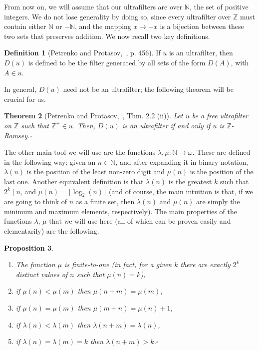 \documentclass{amsart}
\newtheorem{theorem}{Theorem}[section]
\newtheorem{proposition}[theorem]{Proposition}
\theoremstyle{definition}
\newtheorem{definition}[theorem]{Definition}
\theoremstyle{remark}
\numberwithin{equation}{section}
\begin{document}
From now on, we will assume that our ultrafilters are over $\mathbb N$, the set of positive integers. We do not lose generality by doing so, since every ultrafilter over $\mathbb Z$ must contain either $\mathbb N$ or $-\mathbb N$, and the mapping $x\longmapsto -x$ is a bijection between these two sets that preserves addition. We now recall two key definitions.

\begin{definition}[Petrenko and Protasov,~\cite{MR3681104}, p. 456]
    If $u$ is an ultrafilter, then $D(u)$ is defined to be the filter generated by all sets of the form $D(A)$, with $A\in u$.
\end{definition}

In general, $D(u)$ need not be an ultrafilter; the following theorem will be crucial for us.

\begin{theorem}[Petrenko and Protasov,~\cite{MR3681104}, Thm. 2.2 (ii)]
    Let $u$ be a free ultrafilter on $\mathbb Z$ such that $\mathbb Z^{+} \in u$. Then, $D(u)$ is an ultrafilter if and only if $u$ is $\mathbb Z$-Ramsey.\hfill $\square$
\end{theorem}

The other main tool we will use are the functions $\lambda,\mu:\mathbb N\longrightarrow\omega$. These are defined in the following way: given an $n\in\mathbb N$, and after expanding it in binary notation, $\lambda(n)$ is the position of the least non-zero digit and $\mu(n)$ is the position of the last one. Another equivalent definition is that $\lambda(n)$ is the greatest $k$ such that $2^k\mid  n$, and $\mu(n)=\lfloor\log_2(n)\rfloor$ (and of course, the main intuition is that, if we are going to think of $n$ as a finite set, then $\lambda(n)$ and $\mu(n)$ are simply the minimum and maximum elements, respectively). The main properties of the functions $\lambda$, $\mu$ that we will use here (all of which can be proven easily and elementarily) are the following.

\begin{proposition}\label{prop:propertieslambdamu}\hfill
    \begin{enumerate}
        \item The function $\mu$ is finite-to-one (in fact, for a given $k$ there are exactly $2^k$ distinct values of $n$ such that $\mu(n)=k$),
        \item if $\mu(n)<\mu(m)$ then $\mu(n+m)=\mu(m)$,
        \item if $\mu(n)=\mu(m)$ then $\mu(m+n)=\mu(n)+1$,
        \item if $\lambda(n)<\lambda(m)$ then $\lambda(n+m)=\lambda(n)$,
        \item if $\lambda(n)=\lambda(m)=k$ then $\lambda(n+m)>k$.\hfill $\square$
    \end{enumerate}
\end{proposition}
\end{document}
